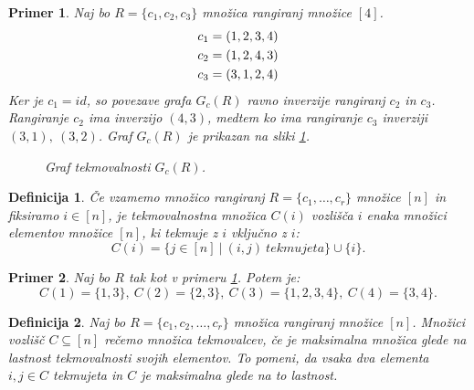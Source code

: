 \documentclass[a4paper, 12pt]{book}
\newtheorem{definicija}{Definicija}[chapter]
\newtheorem{primer}{Primer}[chapter]
\begin{document}
\begin{primer}
\label{primer_tekmovalnostni_graf}
    Naj bo $R = \{ c_1, c_2, c_3 \}$ množica rangiranj množice $[4]$.
    \begin{align*}
        c_1 &= (1, 2, 3, 4) \notag\\
        c_2 &= (1, 2, 4, 3) \notag\\
        c_3 &= (3, 1, 2, 4) \notag
    \end{align*}
    Ker je $c_1=id$, so povezave grafa $G_c(R)$ ravno inverzije rangiranj $c_2$ in $c_3$. Rangiranje $c_2$ ima inverzijo $(4, 3)$, medtem ko ima rangiranje $c_3$ inverziji $(3, 1), \ (3, 2)$. Graf $G_c(R)$ je prikazan na sliki \ref{graf_tekmovalnosti_primer}.
    \begin{figure}[h]
        \begin{center}
        \end{center}
        \caption{Graf tekmovalnosti $G_c(R)$.}
        \label{graf_tekmovalnosti_primer}
    \end{figure}
\end{primer}


\begin{definicija}
    Če vzamemo množico rangiranj $R = \{ c_1, \dots, c_r \}$ množice $[n]$ in fiksiramo $i \in [n]$, je tekmovalnostna množica $C(i)$ vozlišča $i$ enaka množici elementov množice $[n]$, ki tekmuje z $i$ vključno z $i$:
    \[
        C(i) = \{ j \in [n] \ | \ (i, j) \ tekmujeta \} \cup \{ i \}.
    \]
\end{definicija}

\begin{primer}
    Naj bo $R$ tak kot v primeru \ref{primer_tekmovalnostni_graf}. Potem je:
    \[
        C(1) = \{ 1, 3 \}, \ C(2) = \{ 2, 3 \}, \ C(3) = \{ 1, 2, 3, 4 \}, \ C(4) = \{ 3, 4 \}.
    \]
\end{primer}

\begin{definicija}
    Naj bo $R = \{ c_1, c_2, \dots, c_r\}$ množica rangiranj množice $[n]$. Množici  vozlišč $C \subseteq [n]$ rečemo množica tekmovalcev, če je maksimalna množica glede na lastnost tekmovalnosti svojih elementov. To pomeni, da vsaka dva elementa $i, j \in C$ tekmujeta in $C$ je maksimalna glede na to lastnost.
\end{definicija}
\end{document}
